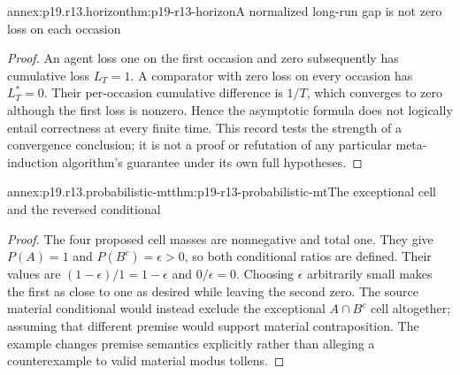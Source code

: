 \begin{annexitem}{annex:p19.r13.horizon}{thm:p19-r13-horizon}{A normalized long-run gap is not zero loss on each occasion}
\begin{proof}
An agent loss one on the first occasion and zero subsequently has
cumulative loss \(L_T=1\). A comparator with zero loss on every
occasion has \(L_T^*=0\). Their per-occasion cumulative difference
is \(1/T\), which converges to zero although the first loss is
nonzero. Hence the asymptotic formula does not logically entail
correctness at every finite time. This record tests the strength of a
convergence conclusion; it is not a proof or refutation of any particular
meta-induction algorithm's guarantee under its own full hypotheses.
\end{proof}\end{annexitem}

\begin{annexitem}{annex:p19.r13.probabilistic-mt}{thm:p19-r13-probabilistic-mt}{The exceptional cell and the reversed conditional}
\begin{proof}
The four proposed cell masses are nonnegative and total one. They give
\(P(A)=1\) and \(P(B^c)=\epsilon>0\), so both conditional ratios
are defined. Their values are
\((1-\epsilon)/1=1-\epsilon\) and \(0/\epsilon=0\).
Choosing \(\epsilon\) arbitrarily small makes the first as close to
one as desired while leaving the second zero. The source material
conditional would instead exclude the exceptional \(A\cap B^c\)
cell altogether; assuming that different premise would support material
contraposition. The example changes premise semantics explicitly rather
than alleging a counterexample to valid material modus tollens.
\end{proof}\end{annexitem}
